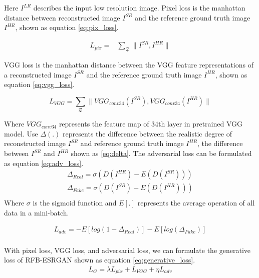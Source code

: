 \documentclass[10pt,twocolumn,letterpaper]{article}
\begin{document}
Here $I^{LR}$ describes the input low resolution image. Pixel loss is the manhattan distance between reconstructed image $I^{SR}$ and the reference ground truth image $I^{HR}$, shown as equation \eqref{eq:pix_loss}.

\begin{equation} \label{eq:pix_loss}
\begin{split}
 L_{pix} = &\sum_{\mathfrak D}\|I^{SR}, I^{HR}\|
\end{split}
\end{equation}

VGG loss is the manhattan distance between the VGG feature representations of a reconstructed image $I^{SR}$ and the reference ground truth image $I^{HR}$, shown as equation \eqref{eq:vgg_loss}.

\begin{equation} \label{eq:vgg_loss}
 L_{VGG} = \sum_{\mathfrak D}\|VGG_{conv34}(I^{SR}), VGG_{conv34}(I^{HR})\|
\end{equation}

Where $VGG_{conv34}$ represents the feature map of $34$th layer in pretrained VGG model. Use $\Delta(.)$ represents the difference between the realistic degree of reconstructed image $I^{SR}$ and reference ground truth image $I^{HR}$, the difference between $I^{SR}$ and $I^{HR}$ shown as \eqref{eq:delta}. The adversarial loss can be formulated as equation \eqref{eq:adv_loss}.
\begin{equation} \label{eq:delta}
\begin{split}
\Delta_{Real} = \sigma(D(I^{HR}) - E(D(I^{SR})))\\ 
\Delta_{Fake} = \sigma(D(I^{SR}) - E(D(I^{HR})))\\ 
\end{split}
\end{equation}
Where $\sigma$ is the sigmoid function and $E[.]$ represents the average operation of all data in a mini-batch.

\begin{equation} \label{eq:adv_loss}
\begin{split}
L_{adv} = -E[log(1-\Delta_{Real})] -E[ log(\Delta_{Fake})]\\ 
\end{split}
\end{equation}

With pixel loss, VGG loss,  and adversarial loss, we can formulate the generative loss of RFB-ESRGAN shown as equation \eqref{eq:generative_loss}.
\begin{equation} \label{eq:generative_loss}
\begin{split}
L_{G} = \lambda L_{pix} +  L_{VGG} + \eta L_{adv}\\ 
\end{split}
\end{equation}
\end{document}
